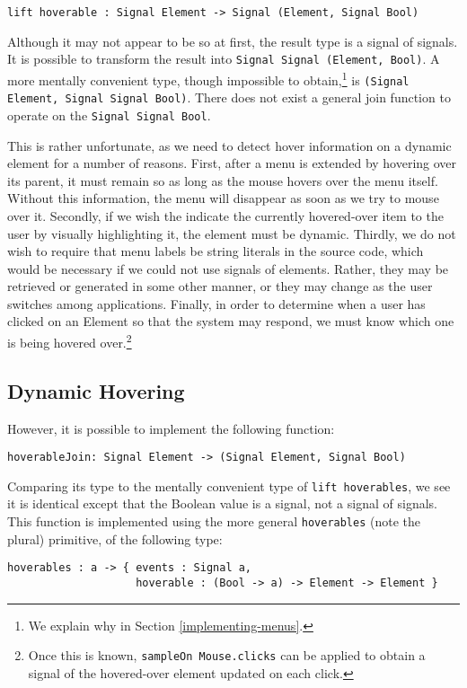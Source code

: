 \documentclass{article}
\begin{document}
\texttt{lift hoverable : Signal Element -\textgreater{} Signal (Element, Signal Bool)}

Although it may not appear to be so at first, the result type is a signal of
signals. It is possible to transform the result into \texttt{Signal Signal
(Element, Bool)}. A more mentally convenient type, though impossible to
obtain,\footnote{We explain why in Section \ref{implementing-menus}.}
is \texttt{(Signal Element, Signal Signal Bool)}. There does not exist a general
join function to operate on the \texttt{Signal Signal Bool}.

This is rather unfortunate, as we need to detect hover information on a dynamic
element for a number of reasons. First, after a menu is extended by hovering
over its parent, it must remain so as long as the mouse hovers over the menu
itself. Without this information, the menu will disappear as soon as we try to
mouse over it. Secondly, if we wish the indicate the currently hovered-over item
to the user by visually highlighting it, the element must be dynamic. Thirdly,
we do not wish to require that menu labels be string literals in the source
code, which would be necessary if we could not use signals of elements. Rather,
they may be retrieved or generated in some other manner, or they may change as
the user switches among applications. Finally, in order to determine when a user
has clicked on an Element so that the system may respond, we must know which one
is being hovered over.\footnote{Once this is known, \texttt{sampleOn
Mouse.clicks} can be applied to obtain a signal of the hovered-over element
updated on each click.}

\subsection{Dynamic Hovering}
However, it is possible to implement the following function:

\texttt{hoverableJoin: Signal Element -\textgreater{} (Signal Element, Signal Bool)}

Comparing its type to the mentally convenient type of \texttt{lift hoverables},
we see it is identical except that the Boolean value is a signal, not a signal
of signals. This function is implemented using the more general
\texttt{hoverables} (note the plural) primitive, of the following type:

\begin{verbatim}
hoverables : a -> { events : Signal a,
                    hoverable : (Bool -> a) -> Element -> Element }
\end{verbatim}
\end{document}
